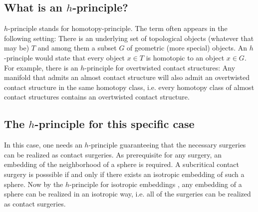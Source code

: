 
\subsection{What is an $h$-principle?}\label{sec:h_principle}
$h$-principle stands for homotopy-principle. The term often appears in the following setting: There is an underlying set of topological objects (whatever that may be) $T$
and among them a subset $G$ of geometric (more special) objects. An $h$-principle would state that every object $x \in T$ is homotopic to an object $x \in G$.
For example, there is an $h$-principle for overtwisted contact structures: Any manifold that admits an almost contact structure will also admit an overtwisted
contact structure in the same homotopy class, i.e. every homotopy class of almost contact structures contains an overtwisted contact structure.


\subsection{The $h$-principle for this specific case}
In this case, one needs an $h$-principle guaranteeing that the necessary surgeries can be realized as contact surgeries.
As prerequisite for any surgery, an embedding of the neighborhood of a sphere is required. 
A subcritical contact surgery is posssible if and only if there exists an isotropic embedding of such a sphere.
Now by the $h$-principle for isotropic embeddings \cite[section 12.4]{EM02}, any embedding of a sphere can be realized in an isotropic way,
i.e. all of the surgeries can be realized as contact surgeries.

